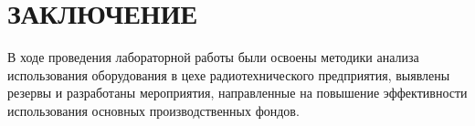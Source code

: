 \section*{ЗАКЛЮЧЕНИЕ}

В ходе проведения лабораторной работы были освоены методики анализа использования
оборудования в цехе радиотехнического предприятия, выявлены резервы и разработаны мероприятия,
направленные на повышение эффективности использования основных производственных фондов.

\newpage
